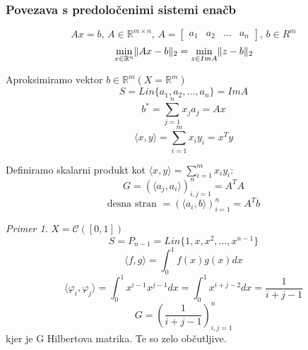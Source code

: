 \documentclass[a4paper,12pt]{article}
\DeclarePairedDelimiter\norm{\lVert}{\rVert}
\newcommand{\innerproduct}[2]{\langle #1, #2 \rangle}
\theoremstyle{definition}
\theoremstyle{remark}
\newtheorem*{ex}{Primer}
\newcommand{\R}{\mathbb{R}}
\begin{document}
\subsubsection{Povezava s predoločenimi sistemi enačb}
\begin{equation*}
    Ax = b \text{, } A\in \R^{m \times n} \text{, } A = 
    \begin{bmatrix}
        a_1 & a_2 & \dots & a_n
    \end{bmatrix} \text{, }  b \in R^m
\end{equation*}
\begin{equation*}
    \min_{x \in \R^n} \norm{Ax - b}_2 = \min_{z \in ImA} \norm{z - b}_2
\end{equation*}

Aproksimiramo vektor $b \in \R^m (X = \R^m)$
\begin{equation*}
    S = Lin\{a_1, a_2, \dots, a_n\} = ImA
\end{equation*}
\begin{equation*}
    b^* = \sum_{j = 1}^{n}x_j a_j = Ax
\end{equation*}
\begin{equation*}
    \innerproduct{x}{y} = \sum_{i = 1}^{m}x_i y_i = x^T y
\end{equation*}

Definiramo skalarni produkt kot $\innerproduct{x}{y} = \sum_{i = 1}^{m} x_i y_i$:
\begin{equation*}
    G = (\innerproduct{a_j}{a_i})_{i, j = 1}^n = A^T A
\end{equation*}
\begin{equation*}
    \text{desna stran } = (\innerproduct{a_i}{b})_{i = 1}^n = A^Tb
\end{equation*}

\begin{ex}
    $X = \mathscr{C} ([0, 1])$
    \begin{equation*}
        S = P_{n-1} = Lin\{1, x, x^2, \dots, x^{n-1}\}
    \end{equation*}
    \begin{equation*}
        \innerproduct{f}{g} = \int_{0}^{1} f(x) g(x) dx
    \end{equation*}
    \begin{equation*}
        \innerproduct{\varphi_i}{\varphi_j} = \int_{0}^{1} x^{i-1} x^{j-1} dx = \int_{0}^{1}x^{i+j-2} dx = \frac{1}{i+j-1}
    \end{equation*}
    \begin{equation*}
        G = (\frac{1}{i+j-1})_{i, j = 1}^n
    \end{equation*}
    kjer je G Hilbertova matrika. Te so zelo občutljive.
\end{ex}
\end{document}
